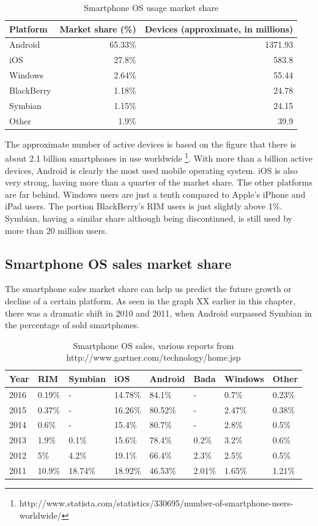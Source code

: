 \documentclass[english,master,public,dept460,male,cpdeclaration,oneside]{diploma}
\begin{document}
\begin{table}[hb]
	\centering
	\caption{Smartphone OS usage market share}
	\begin{tabular}{l r r}
		\toprule		
		Platform & Market share (\%) & Devices (approximate, in millions) \\
		\midrule
		Android & 65.33\% & 1371.93 \\
		iOS & 27.8\% & 583.8 \\
		Windows & 2.64\% & 55.44 \\
		BlackBerry & 1.18\% & 24.78 \\
		Symbian & 1.15\% & 24.15\\
		Other & 1.9\% & 39.9\\
		\midrule
	\end{tabular}
\end{table}

The approximate number of active devices is based on the figure that there is about 2.1 billion smartphones in use worldwide \footnote{http://www.statista.com/statistics/330695/number-of-smartphone-users-worldwide/}. With more than a billion active devices, Android is clearly the most used mobile operating system. iOS is also very strong, having more than a quarter of the market share. The other platforms are far behind. Windows users are just a tenth compared to Apple’s iPhone and iPad users. The portion BlackBerry’s RIM users is just slightly above 1\%. Symbian, having a similar share although being discontinued, is still used by more than 20 million users.

\subsection{Smartphone OS sales market share}
The smartphone sales market share can help us predict the future growth or decline of a certain platform. As seen in the graph XX earlier in this chapter, there was a dramatic shift in 2010 and 2011, when Android surpassed Symbian in the percentage of sold smartphones.

\begin{table}
	\centering
	\caption{Smartphone OS sales, various reports from http://www.gartner.com/technology/home.jsp}
	\begin{tabular}{l l l l l l l l}
		\toprule
		Year & RIM & Symbian & iOS & Android & Bada & Windows & Other\\
		\midrule		
		2016 & 0.19\% & - & 14.78\% & 84.1\% & - & 0.7\% & 0.23\% \\
		2015 & 0.37\% & - & 16.26\% & 80.52\% & - & 2.47\% & 0.38\% \\
		2014 & 0.6\% & - & 15.4\% & 80.7\% & - & 2.8\% & 0.5\% \\
		2013 & 1.9\% & 0.1\% & 15.6\% & 78.4\% & 0.2\% & 3.2\% & 0.6\% \\
		2012 & 5\% & 4.2\% & 19.1\% & 66.4\% & 2.3\% & 2.5\% & 0.5\% \\
		2011 & 10.9\% & 18.74\% & 18.92\% & 46.53\% & 2.01\% & 1.65\% & 1.21\% \\
		\midrule		
	\end{tabular}
\end{table}
\end{document}
